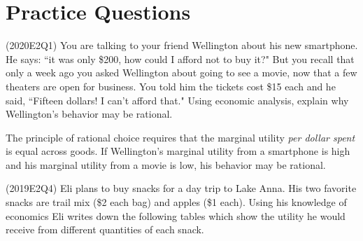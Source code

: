 \documentclass{exam}
\begin{document}
\section{Practice Questions}

\begin{questions}

\question (2020E2Q1) You are talking to your friend Wellington about his new smartphone.  He says: ``it was only \$200, how could I afford not to buy it?"  But you recall that only a week ago you asked Wellington about going to see a movie, now that a few theaters are open for business.  You told him the tickets cost \$15 each and he said, ``Fifteen dollars!  I can’t afford that."  Using economic analysis, explain why Wellington’s behavior may be rational.

\begin{solution} The principle of rational choice requires that the marginal utility \textit{per dollar spent} is equal across goods. If Wellington's marginal utility from a smartphone is high and his marginal utility from a movie is low, his behavior may be rational. \end{solution}

\question (2019E2Q4) Eli plans to buy snacks for a day trip to Lake Anna. His two favorite snacks are trail mix (\$2 each bag) and apples (\$1 each). Using his knowledge of economics Eli writes down the following tables which show the utility he would receive from different quantities of each snack. 

\end{questions}
\end{document}
